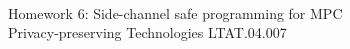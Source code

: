 
\thispagestyle{empty}
\begin{center}

\large
{\thesisUniversity}\\
{\thesisInstitute}\\
{\thesisDepartment}\\

\vspace{45mm}

\Large {\thesisAuthor}

\vspace{4mm}
\large

\huge{Homework 6: Side-channel safe programming for MPC} \\
\vspace{4mm}
\Large {Privacy-preserving Technologies LTAT.04.007}


\vspace{20mm}


\end{center}

\vspace{2mm}

\begin{flushright}
 {
 \setlength{\extrarowheight}{5pt}
 \begin{tabular}{r l} 
 \end{tabular}
 }
\end{flushright}


\vfill
\centerline{\large {\thesisCity} {\thesisYear}}

